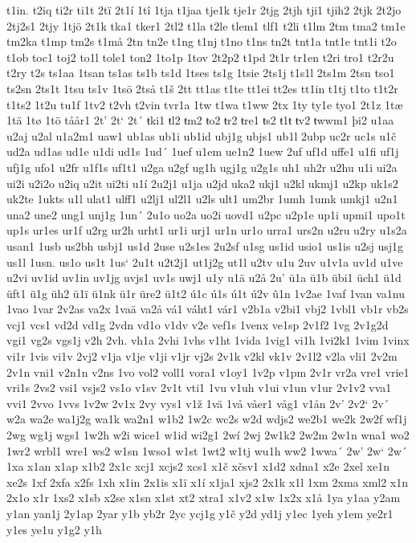 t1in.
t2iq
ti2r
ti1t
2tï
2t1í
1tî
1tja
t1jaa
tje1k
tje1r
2tjg
2tjh
tji1
tjih2
2tjk
2t2jo
2tj2s1
2tjy
1tjö
2t1k
tka1
tker1
2tl2
t1la
t2le
tlem1
tlf1
t2li
t1lm
2tm
tma2
tm1e
tm2ka
t1mp
tm2s
t1må
2tn
tn2e
t1ng
t1nj
t1no
t1ns
tn2t
tnt1a
tnt1e
tnt1i
t2o
t1ob
toc1
toj2
to1l
tole1
ton2
1to1p
1tov
2t2p2
t1pd
2t1r
tr1en
t2ri
tro1
t2r2u
t2ry
t2s
ts1aa
1tsan
ts1as
ts1b
ts1d
1tses
ts1g
1tsie
2ts1j
t1s1l
2ts1m
2tsn
tso1
ts2sn
2ts1t
1tsu
ts1v
1tsö
2tså
t1š
2tt
tt1as
t1te
tt1ei
tt2es
tt1in
t1tj
t1to
t1t2r
t1ts2
1t2u
tu1f
1tv2
t2vh
t2vin
tvr1a
1tw
t1wa
t1ww
2tx
1ty
ty1e
tyo1
2t1z
1tæ
1tä
1tø
1tö
tåår1
2t'
2t`
2t´
ŧki1
ŧl2
ŧm2
ŧo2
ŧr2
ŧre1
ŧs2
ŧ1ŧ
ŧv2
ŧwwm1
þi2
u1aa
u2aj
u2al
u1a2m1
uaw1
ub1as
ub1i
ub1id
ubj1g
ubjs1
ub1l
2ubp
uc2r
uc1s
u1č
ud2a
ud1as
ud1e
u1di
ud1s
1ud´
1uef
u1em
ue1n2
1uew
2uf
uf1d
uffe1
u1fi
uf1j
ufj1g
ufo1
u2fr
u1f1s
uf1t1
u2ga
u2gf
ug1h
ugj1g
u2g1s
uh1
uh2r
u2hu
u1i
ui2a
ui2i
u2i2o
u2iq
u2it
ui2ti
u1í
2u2j1
u1ja
u2jd
uka2
ukj1
u2kl
ukmj1
u2kp
uk1s2
uk2te
1ukts
u1l
ulat1
ulff1
u2lj1
ul2l1
u2ls
ult1
um2br
1umh
1umk
umkj1
u2n1
una2
une2
ung1
unj1g
1un´
2u1o
uo2a
uo2i
uovd1
u2pc
u2p1e
up1i
upmi1
upo1t
up1s
ur1es
ur1f
u2rg
ur2h
urht1
ur1i
urj1
ur1n
ur1o
urra1
urs2n
u2ru
u2ry
u1s2a
usan1
1usb
us2bh
usbj1
us1d
2use
u2s1es
2u2sf
u1sg
us1id
usio1
us1is
u2sj
usj1g
us1l
1usn.
us1o
us1t
1us`
2u1t
u2t2j1
ut1j2g
ut1l
u2tv
u1u
2uv
u1v1a
uv1d
u1ve
u2vi
uv1id
uv1in
uv1jg
uvjs1
uv1s
uwj1
u1y
u1ä
u2å
2u'
ü1a
ü1b
übi1
üch1
ü1d
üft1
ü1g
üh2
ü1ï
ü1nk
ü1r
üre2
ü1t2
ú1c
ú1s
ú1t
ú2v
û1n
1v2ae
1vaf
1van
va1nu
1vao
1var
2v2as
va2x
1vaä
va2å
vá1
váht1
vár1
v2b1a
v2bi1
vbj2
1vbl1
vb1r
vb2s
vcj1
vcs1
vd2d
vd1g
2vdn
vd1o
v1dv
v2e
vef1s
1venx
ve1sp
2v1f2
1vg
2v1g2d
vgi1
vg2s
vgs1j
v2h
2vh.
vh1a
2vhi
1vhs
v1ht
1vida
1vig1
vi1h
1vi2k1
1vim
1vinx
vi1r
1vis
vi1v
2vj2
v1ja
v1je
v1ji
v1jr
vj2s
2v1k
v2kl
vk1v
2v1l2
v2la
vli1
2v2m
2v1n
vni1
v2n1n
v2ns
1vo
vol2
voll1
vora1
v1oy1
1v2p
v1pm
2v1r
vr2a
vre1
vrie1
vri1s
2vs2
vsi1
vsjs2
vs1o
v1sv
2v1t
vti1
1vu
v1uh
v1ui
v1un
v1ur
2v1v2
vva1
vvi1
2vvo
1vvs
1v2w
2v1x
2vy
vys1
v1ž
1vä
1vå
våer1
våg1
v1ån
2v'
2v2`
2v´
w2a
wa2e
wa1j2g
wa1k
wa2n1
w1b2
1w2c
wc2s
w2d
wdjs2
we2b1
we2k
2w2f
wf1j
2wg
wg1j
wgs1
1w2h
w2i
wice1
w1id
wi2g1
2wí
2wj
2w1k2
2w2m
2w1n
wna1
wo2
1wr2
wrbl1
wre1
ws2
w1sn
1wso1
w1st
1wt2
w1tj
wu1h
ww2
1wwa´
2w'
2w`
2w´
1xa
x1an
x1ap
x1b2
2x1c
xcj1
xcjs2
xcs1
x1č
xčsv1
x1d2
xdna1
x2e
2xel
xe1n
xe2s
1xf
2xfa
x2fs
1xh
x1in
2x1is
x1ï
x1í
x1ja1
xjs2
2x1k
x1l
1xm
2xma
xml2
x1n
2x1o
x1r
1xs2
x1sb
x2se
x1sn
x1st
xt2
xtra1
x1v2
x1w
1x2x
x1å
1ya
y1aa
y2am
y1an
yan1j
2y1ap
2yar
y1b
yb2r
2yc
ycj1g
y1č
y2d
yd1j
y1ec
1yeh
y1em
ye2r1
y1es
ye1u
y1g2
y1h
